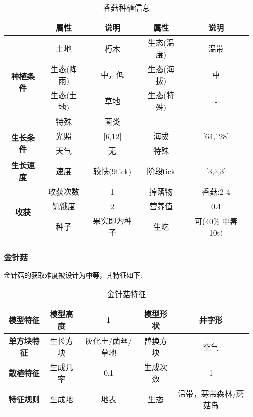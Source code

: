 \begin{table}[H]
    \centering
    \caption{香菇种植信息}
    \label{table:香菇种植信息}
    \setlength{\tabcolsep}{4mm}
    \begin{tabular}{c|cc|cc}
        \toprule
                                           & \textbf{属性} & \textbf{说明} & \textbf{属性} & \textbf{说明} \\
        \midrule
        \multirow{4}{*}{\textbf{种植条件}} & 土地          & 朽木          & 生态(温度)    & 温带    \\
                                           & 生态(降雨)    & 中，低        & 生态(海拔)    & 中            \\
                                           & 生态(土地)    & 草地          & 生态(特殊)    & -             \\
                                           & 特殊          & 菌类           \\
        \midrule
        \multirow{2}{*}{\textbf{生长条件}} & 光照          & [6,12]        & 海拔          & [64,128]      \\
                                           & 天气          & 无            & 特殊          & -             \\
        \midrule
        \textbf{生长速度}                  & 速度          & 较快(9tick)     & 阶段tick      & [3,3,3]       \\
        \midrule
        \multirow{3}{*}{\textbf{收获}}     & 收获次数      & 1             & 掉落物        & 香菇:2-4      \\
                                           & 饥饿度        & 2             & 营养值        & 0.4           \\
                                           & 种子          & 果实即为种子  & 生吃          & 可(40\% 中毒 10s)   \\
        \bottomrule
    \end{tabular}
\end{table}

\subsubsection{金针菇}

金针菇的获取难度被设计为\textbf{中等}，其特征如下:
\begin{table}[H]
    \centering
    \caption{金针菇特征}
    \label{table:金针菇特征}
    \setlength{\tabcolsep}{4mm}
    \begin{tabular}{c|cc|cc}
        \toprule
        \textbf{模型特征}   & 模型高度 & 1      & 模型形状 & 井字形     \\
        \midrule
        \textbf{单方块特征} & 生长方块 & 灰化土/菌丝/草地 & 替换方块 & 空气     \\
        \midrule
        \textbf{散植特征}   & 生成几率 & 0.1   & 生成次数 & 1        \\
        \midrule
        \textbf{特征规则}   & 生成地   & 地表   & 生态     & 温带，寒带森林/蘑菇岛 \\
        \bottomrule
    \end{tabular}
\end{table}


